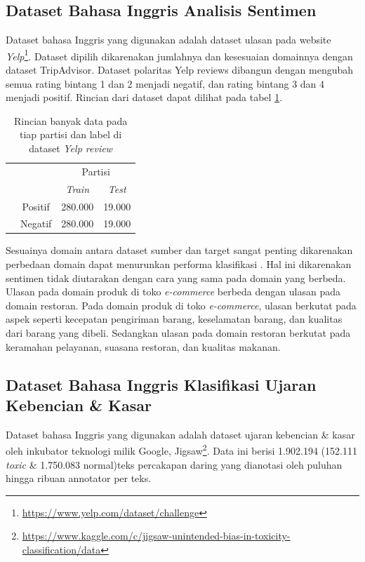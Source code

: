 	\subsection{Dataset Bahasa Inggris Analisis Sentimen}
	Dataset bahasa Inggris yang digunakan adalah dataset ulasan pada website \textit{Yelp}\footnote{\url{https://www.yelp.com/dataset/challenge}}. Dataset dipilih dikarenakan jumlahnya dan kesesuaian domainnya dengan dataset TripAdvisor. Dataset polaritas Yelp reviews  dibangun dengan mengubah semua rating bintang 1 dan 2 menjadi negatif, dan rating bintang 3 dan 4 menjadi positif. Rincian dari dataset dapat dilihat pada tabel \ref{tab:detail_yelp_review}.

	\begin{table}[ht]
	    \centering
	    \caption{Rincian banyak data pada tiap partisi dan label di dataset \textit{Yelp review}}
	    \begin{tabular}{@{}cc|cc@{}}
	    \multicolumn{1}{c}{} &\multicolumn{1}{c}{} &\multicolumn{2}{c}{Partisi} \\ 
	    \multicolumn{1}{c}{} & 
	    \multicolumn{1}{c|}{} & 
	    \multicolumn{1}{c}{\textit{Train}} & 
	    \multicolumn{1}{c}{\textit{Test}} \\ 
	    \cline{2-4}
	    \multirow[c]{2}{*}{\rotatebox[origin=tr]{90}{Label}}
	    & Positif  & 280.000 & 19.000   \\[1.5ex]
	    & Negatif  & 280.000 & 19.000   \\ 
	    \cline{2-4}
	    \end{tabular}
	    \label{tab:detail_yelp_review}
	\end{table}

	Sesuainya domain antara dataset sumber dan target sangat penting dikarenakan perbedaan domain dapat menurunkan performa klasifikasi \parencite{Lai_Oguz_Yang_Stoyanov_2019}. Hal ini dikarenakan sentimen tidak diutarakan dengan cara yang sama pada domain yang berbeda. Ulasan pada domain produk di toko \textit{e-commerce} berbeda dengan ulasan pada domain restoran. Pada domain produk di toko \textit{e-commerce}, ulasan berkutat pada aspek seperti kecepatan pengiriman barang, keselamatan barang, dan kualitas dari barang yang dibeli. Sedangkan ulasan pada domain restoran berkutat pada keramahan pelayanan, suasana restoran, dan kualitas makanan.
	
	\subsection{Dataset Bahasa Inggris Klasifikasi Ujaran Kebencian \& Kasar}
	Dataset bahasa Inggris yang digunakan adalah dataset ujaran kebencian \& kasar oleh inkubator teknologi milik Google, Jigsaw\footnote{\url{https://www.kaggle.com/c/jigsaw-unintended-bias-in-toxicity-classification/data}}. Data ini berisi 1.902.194 (152.111 \textit{toxic} \& 1.750.083 normal)teks percakapan daring yang dianotasi oleh puluhan hingga ribuan annotator per teks. 

